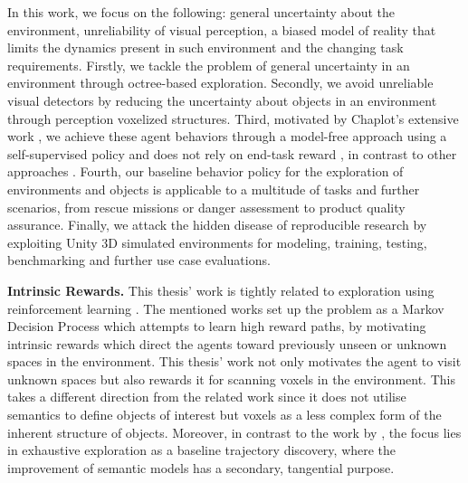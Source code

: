 In this work, we focus on the following: general uncertainty about the environment, unreliability of visual perception, a biased model of reality that limits the dynamics present in such environment and the changing task requirements. Firstly, we tackle the problem of general uncertainty in an environment through octree-based exploration. Secondly, we avoid unreliable visual detectors by reducing the uncertainty about objects in an environment through perception voxelized structures. Third, motivated by Chaplot's extensive work \cite{chaplot2017arnold, chaplot2018gated, chaplot2020learning, chaplot2020neural, chaplot2020semantic}, we achieve these agent behaviors through a model-free approach using a self-supervised policy and does not rely on end-task reward \cite{schulman2017proximal, sung2018exploring}, in contrast to other approaches \cite{chaplot2018active, jayaraman2018learning, yang2019embodied}. Fourth, our baseline behavior policy for the exploration of environments and objects is applicable to a multitude of tasks and further scenarios, from rescue missions or danger assessment to product quality assurance. Finally, we attack the hidden disease of reproducible research by exploiting Unity 3D simulated environments for modeling, training, testing, benchmarking and further use case evaluations.




\textbf{Intrinsic Rewards.} %
This thesis' work is tightly related to exploration using reinforcement learning \cite{auer2002using, jaksch2010near, schmidhuber1991possibility, sutton2018reinforcement, song2021autonomous}. 
The mentioned works set up the problem as a Markov Decision Process which attempts to learn high reward paths, by motivating intrinsic rewards which direct the agents toward previously unseen \cite{eysenbach2018diversity} or unknown spaces \cite{pathak2017curiosity} in the environment. 
%
This thesis' work not only motivates the agent to visit unknown spaces but also rewards it for scanning voxels in the environment. This takes a different direction from the related work since it does not utilise semantics to define objects of interest but voxels as a less complex form of the inherent structure of objects. Moreover, in contrast to the work by \cite{chaplot2020semantic}, the focus lies in exhaustive exploration as a baseline trajectory discovery, where the improvement of semantic models has a secondary, tangential purpose. 

